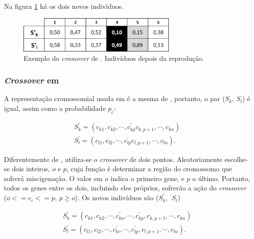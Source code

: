 Na figura \ref{fig:cross2004_tabelaDepois} há os dois novos indivíduos.

\begin{figure}[htbp]
	\centering
		\includegraphics[width=0.70\textwidth]{figs/materiais_metodo/autovalores_com_ga/cross2004_tabelaDepois.png}
	\caption{Exemplo do \emph{crossover} de \cite{metodo2004}. Indivíduos depois da reprodução.}
	\label{fig:cross2004_tabelaDepois}
\end{figure}

\subsubsection{\emph{Crossover} em \cite{metodo2011}}	

	A representação cromossomial usada em \cite{metodo2011} é a mesma de \cite{metodo2004}, portanto, o par ($S_k$, $S_l$) é igual, assim como a probabilidade $p_c$:
	
	\begin{equation}
		\begin{array}{l}
		S^{'}_k = (c_{k1}, c_{k2}, \cdots, c^{'}_{kp} c_{k,p+1}, \cdots, c_{kn})	\\
			S^{'}_l = (c_{l1}, c_{l2}, \cdots,  c^{'}_{lp} c_{l,p+1}, \cdots, c_{ln}).	
		\end{array}
	\end{equation}
	
	Diferentemente de \cite{metodo2004}, utiliza-se o \emph{crossover} de dois pontos. Aleatoriamente escolhe-se dois inteiros, $o$ e $p$, cuja função é determinar a região do cromossomo que sofrerá miscigenação. O valor em $o$ indica o primeiro gene, e $p$ o último. Portanto, todos os genes entre os dois, incluindo eles próprios, sofrerão a ação do \emph{crossover} ($o <= c_i <= p$, $p \geq o$). Os novos indivíduos são ($S^{'}_k$, $^{'}S_l$)
	
	\begin{equation}
		\begin{array}{l}
			S^{'}_k = (c_{k1}, c_{k2}, \cdots, c^{'}_{ko}, \cdots , c^{'}_{kp}, c_{k,p+1}, \cdots, c_{kn})	\\
			S^{'}_l = (c_{l1}, c_{l2}, \cdots, c^{'}_{lo}, \cdots , c^{'}_{lp}, c_{l,p+1}, \cdots, c_{ln}).	
		\end{array}
	\end{equation}
	
